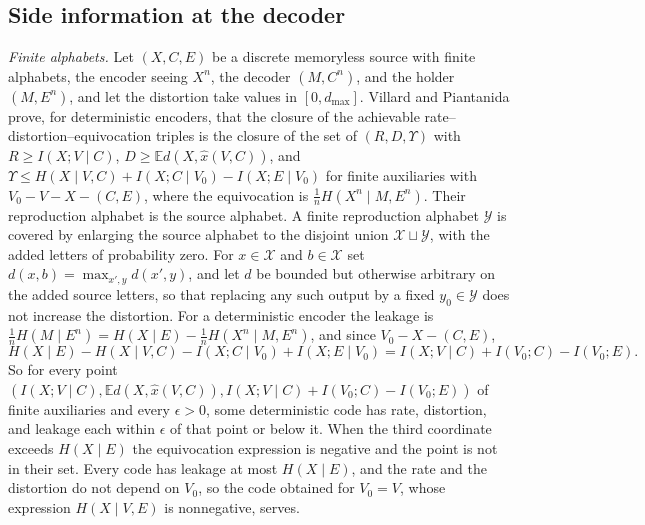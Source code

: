 \documentclass[11pt,onecolumn]{IEEEtran}
\newcommand{\E}{\mathbb{E}}
\begin{document}
\subsection{Side information at the decoder}
\label{app:decsi}

\emph{Finite alphabets.} Let $(X,C,E)$ be a discrete memoryless source
with finite alphabets, the encoder seeing $X^n$, the decoder $(M,C^n)$,
and the holder $(M,E^n)$, and let the distortion take values in
$[0,d_{\max}]$. Villard and Piantanida \cite[Theorem~3]{villard2013} prove,
for deterministic encoders, that the closure of the achievable
rate--distortion--equivocation triples is the closure of the set of
$(R,D,\Upsilon)$ with $R\ge I(X;V\mid C)$, $D\ge\E d(X,\hat x(V,C))$, and
$\Upsilon\le H(X\mid V,C)+I(X;C\mid V_0)-I(X;E\mid V_0)$ for finite
auxiliaries with $V_0-V-X-(C,E)$, where the equivocation is
$\tfrac1nH(X^n\mid M,E^n)$. Their reproduction alphabet is the source
alphabet. A finite reproduction alphabet $\mathcal Y$ is covered by
enlarging the source alphabet to the disjoint union
$\mathcal X\sqcup\mathcal Y$, with the
added letters of probability zero. For $x\in\mathcal X$ and $b\in\mathcal X$ set
$d(x,b)=\max_{x',y}d(x',y)$, and let $d$ be bounded but otherwise arbitrary on
the added source letters, so that replacing any such output by a fixed
$y_0\in\mathcal Y$ does not increase the distortion. For a deterministic
encoder the leakage is $\tfrac1nH(M\mid E^n)=H(X\mid E)-\tfrac1nH(X^n\mid M,E^n)$,
and since $V_0-X-(C,E)$,
\[
H(X\mid E)-H(X\mid V,C)-I(X;C\mid V_0)+I(X;E\mid V_0)
=I(X;V\mid C)+I(V_0;C)-I(V_0;E).
\]
So for every point
$(I(X;V\mid C),\E d(X,\hat x(V,C)),I(X;V\mid C)+I(V_0;C)-I(V_0;E))$ of
finite auxiliaries and every $\epsilon>0$, some deterministic code has
rate, distortion, and leakage each within $\epsilon$ of that point or
below it. When the third coordinate exceeds $H(X\mid E)$ the
equivocation expression is negative and the point is not in their set.
Every code has leakage at most $H(X\mid E)$, and the rate and the
distortion do not depend on $V_0$, so the code obtained for $V_0=V$,
whose expression $H(X\mid V,E)$ is nonnegative, serves.
\end{document}
